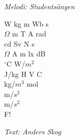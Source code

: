 {\footnotesize\textit{Melodi: Studentsången}}\par
\vspace{10pt}
W kg m Wb s\\
$\Omega$ m T A rad\\
cd Sv N s\\
$\Omega$  A m lx dB\\
$^{\circ}$C W/$m^{2}$\\
J/kg H V C\\
kg/$m^{3}$ mol\\
m/$s^{2}$\\
m/$s^{2}$\\
F!\par
\vspace{10pt}
{\footnotesize\textit{Text: Anders Skog}}

